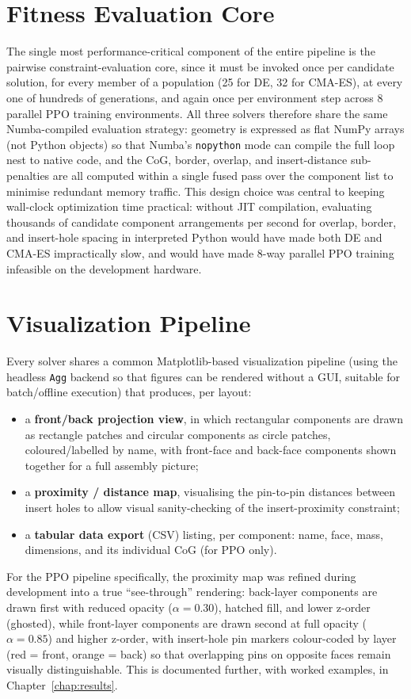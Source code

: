 \documentclass[11pt,a4paper,oneside]{report}
\begin{document}
\section{Fitness Evaluation Core}
The single most performance-critical component of the entire pipeline is the pairwise constraint-evaluation core, since it must be invoked once per candidate solution, for every member of a population (25 for DE, 32 for CMA-ES), at every one of hundreds of generations, and again once per environment step across 8 parallel PPO training environments. All three solvers therefore share the same Numba-compiled evaluation strategy: geometry is expressed as flat NumPy arrays (not Python objects) so that Numba's \texttt{nopython} mode can compile the full loop nest to native code, and the CoG, border, overlap, and insert-distance sub-penalties are all computed within a single fused pass over the component list to minimise redundant memory traffic. This design choice was central to keeping wall-clock optimization time practical: without JIT compilation, evaluating thousands of candidate component arrangements per second for overlap, border, and insert-hole spacing in interpreted Python would have made both DE and CMA-ES impractically slow, and would have made 8-way parallel PPO training infeasible on the development hardware.

\section{Visualization Pipeline}
Every solver shares a common Matplotlib-based visualization pipeline (using the headless \texttt{Agg} backend so that figures can be rendered without a GUI, suitable for batch/offline execution) that produces, per layout:
\begin{itemize}
    \item a \textbf{front/back projection view}, in which rectangular components are drawn as rectangle patches and circular components as circle patches, coloured/labelled by name, with front-face and back-face components shown together for a full assembly picture;
    \item a \textbf{proximity / distance map}, visualising the pin-to-pin distances between insert holes to allow visual sanity-checking of the insert-proximity constraint;
    \item a \textbf{tabular data export} (CSV) listing, per component: name, face, mass, dimensions, and its individual CoG  (for PPO only).
\end{itemize}
For the PPO pipeline specifically, the proximity map was refined during development into a true ``see-through'' rendering: back-layer components are drawn first with reduced opacity ($\alpha = 0.30$), hatched fill, and lower z-order (ghosted), while front-layer components are drawn second at full opacity ($\alpha = 0.85$) and higher z-order, with insert-hole pin markers colour-coded by layer (red = front, orange = back) so that overlapping pins on opposite faces remain visually distinguishable. This is documented further, with worked examples, in Chapter~\ref{chap:results}.
\end{document}
